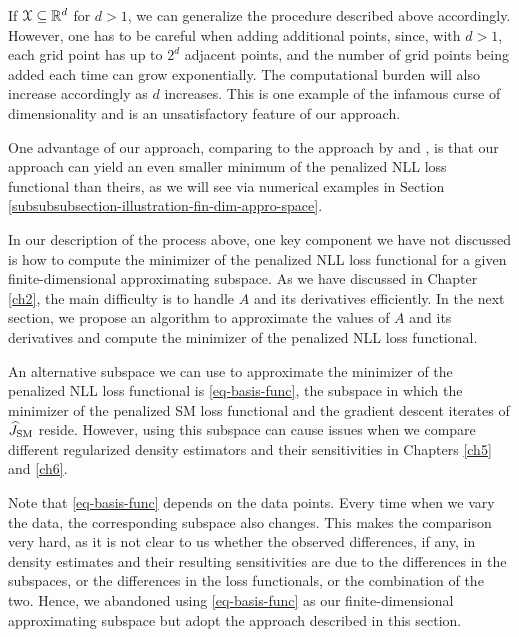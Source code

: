 If $\mathcal{X} \subseteq \mathbb{R}^d$ for $d > 1$, we can generalize the procedure described above accordingly. However, one has to be careful when adding additional points, since, with $d > 1$, each grid point has up to $2^d$ adjacent points, and the number of grid points being added each time can grow exponentially. The computational burden will also increase accordingly as $d$ increases. This is one example of the infamous curse of dimensionality and is an unsatisfactory feature of our approach. 

One advantage of our approach, comparing to the approach by \textcite{Gu1993-na} and \textcite{Gu1993-lf}, is that our approach can yield an even smaller minimum of the penalized NLL loss functional than theirs, as we will see via numerical examples in Section \ref{subsubsubsection-illustration-fin-dim-appro-space}. 

In our description of the process above, one key component we have not discussed is how to compute the minimizer of the penalized NLL loss functional for a given finite-dimensional approximating subspace. As we have discussed in Chapter \ref{ch2}, the main difficulty is to handle $A$ and its derivatives efficiently. In the next section, we propose an algorithm to approximate the values of $A$ and its derivatives and compute the minimizer of the penalized NLL loss functional. 

\begin{remark}
	An alternative subspace we can use to approximate the minimizer of the penalized NLL loss functional is \eqref{eq-basis-func}, the subspace in which the minimizer of the penalized SM loss functional and the gradient descent iterates of $\widehat{J}_{\mathrm{SM}}$ reside. However, using this subspace can cause issues when we compare different regularized density estimators and their sensitivities in Chapters \ref{ch5} and \ref{ch6}. 
	
	Note that \eqref{eq-basis-func} depends on the data points. Every time when we vary the data, the corresponding subspace also changes. This makes the comparison very hard, as it is not clear to us whether the observed differences, if any, in density estimates and their resulting sensitivities are due to the differences in the subspaces, or the differences in the loss functionals, or the combination of the two. Hence, we abandoned using \eqref{eq-basis-func} as our finite-dimensional approximating subspace but adopt the approach described in this section.
\end{remark}


